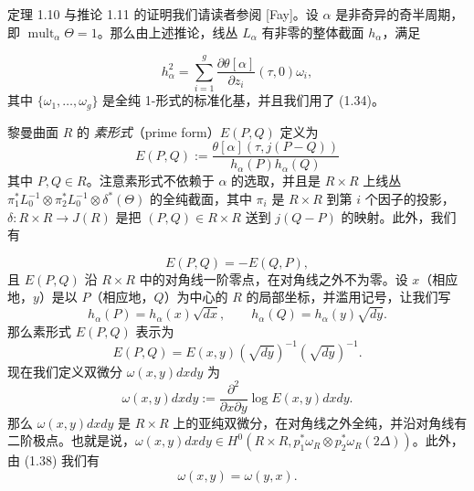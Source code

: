 \begin{sloppypar}定理 1.10 与推论 1.11 的证明我们请读者参阅 [Fay]。设 $\alpha$ 是非奇异的奇半周期，即 $\operatorname{mult}_\alpha\Theta=1$。那么由上述推论，线丛 $L_\alpha$ 有非零的整体截面 $h_\alpha$，满足
\end{sloppypar}
\begin{equation}
  h_\alpha^2=\sum_{i=1}^{g}\frac{\partial\theta[\alpha]}{\partial z_i}(\tau,0)\omega_i, \tag{1.36}
\end{equation}
其中 $\{\omega_1,\dots,\omega_g\}$ 是全纯 1-形式的标准化基，并且我们用了 (1.34)。


黎曼曲面 $R$ 的 \emph{素形式}（prime form）$E(P,Q)$ 定义为
\begin{equation}
  E(P,Q):=\frac{\theta[\alpha](\tau,j(P-Q))}{h_\alpha(P)h_\alpha(Q)} \tag{1.37}
\end{equation}
其中 $P,Q\in R$。注意素形式不依赖于 $\alpha$ 的选取，并且是 $R\times R$ 上线丛 $\pi_1^*L_0^{-1}\otimes\pi_2^*L_0^{-1}\otimes\delta^*(\Theta)$ 的全纯截面，其中 $\pi_i$ 是 $R\times R$ 到第 $i$ 个因子的投影，$\delta:R\times R\to J(R)$ 是把 $(P,Q)\in R\times R$ 送到 $j(Q-P)$ 的映射。此外，我们有


\begin{equation}
  E(P,Q)=-E(Q,P), \tag{1.38}
\end{equation}
且 $E(P,Q)$ 沿 $R\times R$ 中的对角线一阶零点，在对角线之外不为零。设 $x$（相应地，$y$）是以 $P$（相应地，$Q$）为中心的 $R$ 的局部坐标，并滥用记号，让我们写
\[
  h_\alpha(P)=h_\alpha(x)\sqrt{dx},\qquad h_\alpha(Q)=h_\alpha(y)\sqrt{dy}.
\]
那么素形式 $E(P,Q)$ 表示为
\[
  E(P,Q)=E(x,y)(\sqrt{dy})^{-1}(\sqrt{dy})^{-1}.
\]
现在我们定义双微分 $\omega(x,y)dxdy$ 为
\begin{equation}
  \omega(x,y)dxdy:=\frac{\partial^2}{\partial x\partial y}\log E(x,y)dxdy. \tag{1.39}
\end{equation}
那么 $\omega(x,y)dxdy$ 是 $R\times R$ 上的亚纯双微分，在对角线之外全纯，并沿对角线有二阶极点。也就是说，$\omega(x,y)dxdy\in H^0(R\times R,p_1^*\omega_R\otimes p_2^*\omega_R(2\Delta))$。此外，由 (1.38) 我们有
\begin{equation}
  \omega(x,y)=\omega(y,x). \tag{1.40}
\end{equation}

